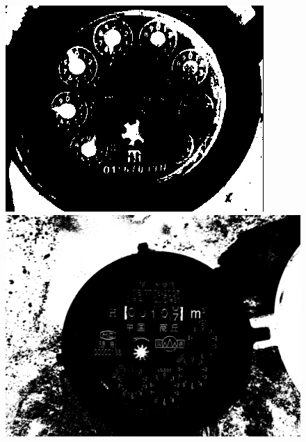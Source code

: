 \documentclass[a4paper]{ctexart}
\begin{document}
\begin{figure}[htbp]
	\centering
	\begin{minipage}[t]{0.25\textwidth}
		\centering
		\includegraphics[width=\textwidth]{figure/kmeans/img1.jpg}
	\end{minipage}
	\begin{minipage}[t]{0.25\textwidth}
		\centering
		\includegraphics[width=\textwidth]{figure/kmeans/img2.jpg}
	\end{minipage}\\
	\begin{minipage}[t]{0.25\textwidth}
		\centering

\end{minipage}
\end{figure}
\end{document}
